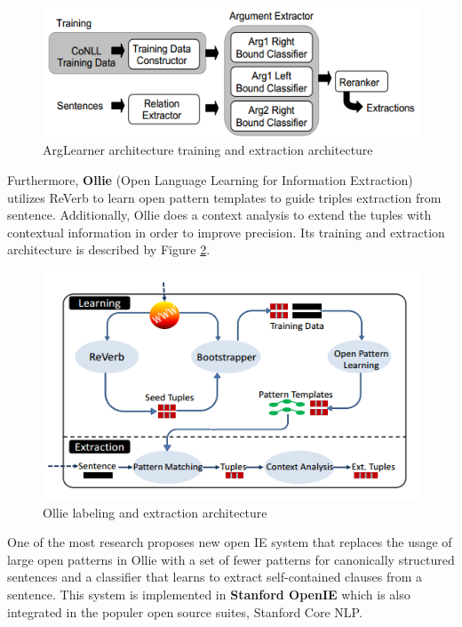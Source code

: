 \documentclass[conference,compsoc,12pt]{IEEEtran}
\begin{document}
\begin{figure}
\centering
\includegraphics[scale=0.5]{../images/arglearner_architecture.png}
\caption{ArgLearner architecture training and extraction architecture}
\label{fig_arglearner_architecture}
\end{figure}

Furthermore, \textbf{Ollie} (Open Language Learning for Information Extraction)\cite{schmitz2012open} utilizes ReVerb\cite{fader2011identifying} to learn open pattern templates to guide triples extraction from sentence. Additionally, Ollie does a context analysis to extend the tuples with contextual information in order to improve precision\cite{schmitz2012open}. Its training and extraction architecture is described by Figure \ref{fig_ollie_architecture}.

\begin{figure}
\centering
\includegraphics[scale=0.5]{../images/ollie_architecture.png}
\caption{Ollie labeling and extraction architecture}
\label{fig_ollie_architecture}
\end{figure}

One of the most research proposes new open IE system that replaces the usage of large open patterns in Ollie\cite{schmitz2012open} with a set of fewer patterns for canonically structured sentences and a classifier that learns to extract self-contained clauses from a sentence\cite{angeli2015leveraging}. This system is implemented in \textbf{Stanford OpenIE} which is also integrated in the populer open source suites, Stanford Core NLP.
\end{document}

